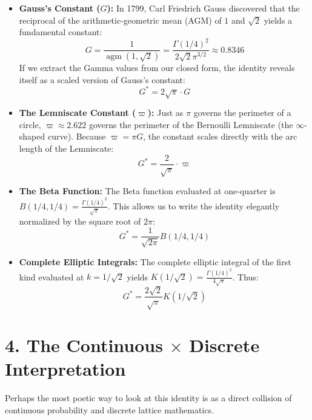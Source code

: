 \documentclass[12pt]{article}
\begin{document}
\begin{itemize}
    \item \textbf{Gauss's Constant ($G$):} In 1799, Carl Friedrich Gauss discovered that the reciprocal of the arithmetic-geometric mean (AGM) of $1$ and $\sqrt{2}$ yields a fundamental constant:
    \begin{equation*}
        G = \frac{1}{\operatorname{agm}(1, \sqrt{2})} = \frac{\Gamma(1/4)^2}{2\sqrt{2}\pi^{3/2}} \approx 0.8346
    \end{equation*}
    If we extract the Gamma values from our closed form, the identity reveals itself as a scaled version of Gauss's constant:
    \begin{equation}
        \boxed{ G^* = 2\sqrt{\pi} \cdot G }
    \end{equation}

    \item \textbf{The Lemniscate Constant ($\varpi$):} Just as $\pi$ governs the perimeter of a circle, $\varpi \approx 2.622$ governs the perimeter of the Bernoulli Lemniscate (the $\infty$-shaped curve). Because $\varpi = \pi G$, the constant scales directly with the arc length of the Lemniscate:
    \begin{equation}
        \boxed{ G^* = \frac{2}{\sqrt{\pi}} \cdot \varpi }
    \end{equation}

    \item \textbf{The Beta Function:} The Beta function evaluated at one-quarter is $B(1/4, 1/4) = \frac{\Gamma(1/4)^2}{\sqrt{\pi}}$. This allows us to write the identity elegantly normalized by the square root of $2\pi$:
    \begin{equation}
        \boxed{ G^* = \frac{1}{\sqrt{2\pi}} B(1/4, 1/4) }
    \end{equation}

    \item \textbf{Complete Elliptic Integrals:} The complete elliptic integral of the first kind evaluated at $k=1/\sqrt{2}$ yields $K(1/\sqrt{2}) = \frac{\Gamma(1/4)^2}{4\sqrt{\pi}}$. Thus:
    \begin{equation}
        \boxed{ G^* = \frac{2\sqrt{2}}{\sqrt{\pi}} K(1/\sqrt{2}) }
    \end{equation}
\end{itemize}

\section*{4. The Continuous $\times$ Discrete Interpretation}
Perhaps the most poetic way to look at this identity is as a direct collision of continuous probability and discrete lattice mathematics.
\end{document}
